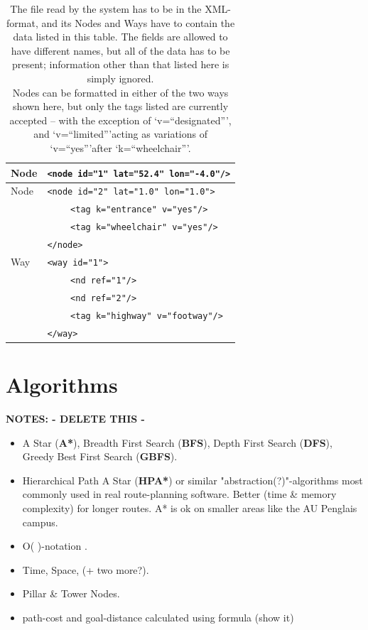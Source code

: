 \begin{table}
	\begin{tabular}{| l | l |}
		\hline
		Node & \verb|<node id="1" lat="52.4" lon="-4.0"/>|  \\
		\hline
		\hline
		Node & \verb|<node id="2" lat="1.0" lon="1.0">|\\
			& ~~~~ \verb|<tag k="entrance" v="yes"/>|\\
			& ~~~~ \verb|<tag k="wheelchair" v="yes"/>|\\
		& \verb|</node>|\\
		\hline\hline
		Way & \verb|<way id="1">|\\
			& ~~~~ \verb|<nd ref="1"/>|\\
			& ~~~~ \verb|<nd ref="2"/>|\\
			& ~~~~ \verb|<tag k="highway" v="footway"/>|\\
		& \verb|</way>|\\
		\hline
	\end{tabular}
	\caption[Structure of \textit{.osm} file]{The file read by the system has to be in the XML-format, and its Nodes and Ways have to contain the data listed in this table. The fields are allowed to have different names, but all of the data has to be present; information other than that listed here is simply ignored.\\Nodes can be formatted in either of the two ways shown here, but only the tags listed are currently accepted -- with the exception of \textquoteleft v=\textquotedblleft designated\textquotedblright\textquoteright, and \textquoteleft v=\textquotedblleft limited\textquotedblright\textquoteright acting as variations of \textquoteleft v=\textquotedblleft yes\textquotedblright\textquoteright after \textquoteleft k=\textquotedblleft wheelchair\textquotedblright\textquoteright.}
	\label{tab:nodeWayLables}
\end{table}

\section{Algorithms}
\textbf{NOTES: - DELETE THIS -}
\begin{itemize}
	\item A Star (\textbf{A*}), Breadth First Search (\textbf{BFS}), Depth First Search (\textbf{DFS}), Greedy Best First Search (\textbf{GBFS}).
	\item Hierarchical Path A Star (\textbf{HPA*}) or similar "abstraction(?)"-algorithms most commonly used in real route-planning software. Better (time \& memory complexity) for longer routes. A* is ok on smaller areas like the AU Penglais campus.
	\item O( )-notation \cite[P.82 \& P.1037]{RN27}.
	\item Time, Space, (+ two more?).
	\item Pillar \& Tower Nodes.
	\item path-cost and goal-distance calculated using formula (show it)
\end{itemize}



